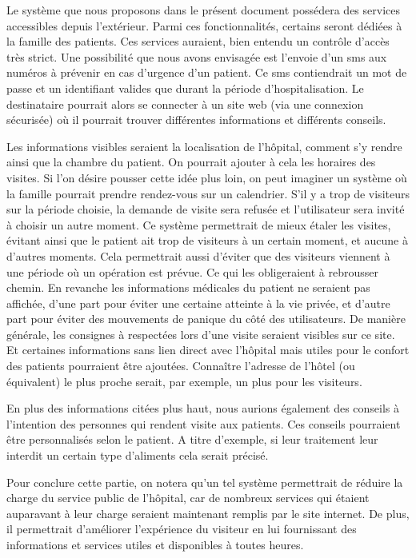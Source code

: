 Le système que nous proposons dans le présent document possédera des services accessibles depuis l'extérieur. Parmi ces
fonctionnalités, certains seront dédiées à la famille des patients. Ces services auraient, bien entendu un contrôle d'accès très
strict. Une possibilité que nous avons envisagée est l'envoie d'un sms aux numéros à prévenir en cas d'urgence d'un patient. Ce
sms contiendrait un mot de passe et un identifiant valides que durant la période d'hospitalisation. Le destinataire pourrait alors
se connecter à un site web (via une connexion sécurisée) où il pourrait trouver différentes informations et différents conseils.
\newline

Les informations visibles seraient la localisation de l'hôpital, comment s'y rendre ainsi que la chambre du patient. On pourrait
ajouter à cela les horaires des visites. Si l'on désire pousser cette idée plus loin, on peut imaginer un système où la famille
pourrait prendre rendez-vous sur un calendrier. S'il y a trop de visiteurs sur la période choisie, la demande de visite sera
refusée et l'utilisateur sera invité à choisir un autre moment. Ce système permettrait de mieux étaler les visites, évitant ainsi que le
patient ait trop de visiteurs à un certain moment, et aucune à d'autres moments. Cela permettrait aussi d'éviter que des visiteurs
viennent à une période où un opération est prévue. Ce qui les obligeraient à rebrousser chemin. En revanche les informations
médicales du patient ne seraient pas affichée, d'une part pour éviter une certaine atteinte à la vie privée, et d'autre part pour
éviter des mouvements de panique du côté des utilisateurs. De manière générale, les consignes à respectées lors d'une visite
seraient visibles sur ce site. Et certaines informations sans lien direct avec l'hôpital mais utiles pour le confort des patients
pourraient être ajoutées. Connaître l'adresse de l'hôtel (ou équivalent) le plus proche serait, par exemple, un plus pour les
visiteurs.
\newline

En plus des informations citées plus haut, nous aurions également des conseils à l'intention des personnes qui rendent visite aux
patients. Ces conseils pourraient être personnalisés selon le patient. A titre d'exemple, si leur traitement leur interdit un certain type d'aliments
cela serait précisé. 
\newline

Pour conclure cette partie, on notera qu'un tel système permettrait de réduire la charge du service public de l'hôpital, car de
nombreux services qui étaient auparavant à leur charge seraient maintenant remplis par le site internet. De plus, il permettrait
d'améliorer l'expérience du visiteur en lui fournissant des informations et services utiles et disponibles à toutes heures.
